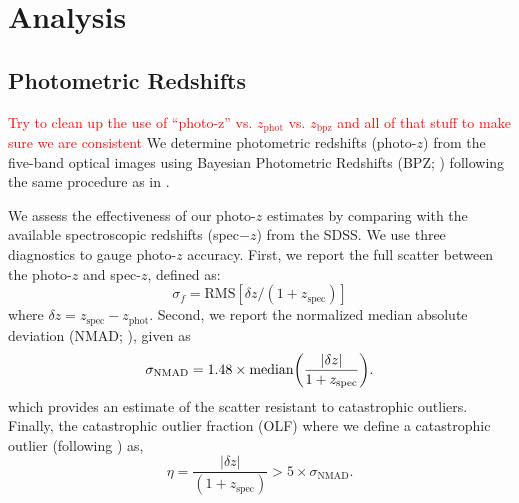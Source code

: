 \documentclass[apj, revtex4-1]{emulateapj}
\newcommand{\editorial}[1]{\textcolor{red}{#1}}
\begin{document}
\section{Analysis}\label{sec:analysis}
\subsection{Photometric Redshifts}
\editorial{Try to clean up the use of ``photo-z'' vs. $z_\mathrm{phot}$ vs. $z_\mathrm{bpz}$ and all of that stuff to make sure we are consistent}
We determine photometric redshifts (photo-$z$) from the five-band optical images using Bayesian Photometric Redshifts (BPZ; \citealt{Benitez2000, Coe2006}) following the same procedure as in \cite{Menanteau2009a}.

We assess the effectiveness of our photo-$z$ estimates by comparing with the available spectroscopic redshifts (spec$-z$) from the SDSS. We use three diagnostics to gauge photo-$z$ accuracy. First, we report the full scatter between the photo-$z$ and spec-$z$, defined as:
\begin{equation}\label{eqn:scatter}
	\sigma_f = \mathrm{RMS}[\delta z/(1+z_\mathrm{spec})]
\end{equation}
where $\delta z = z_\mathrm{spec} - z_\mathrm{phot}$. Second, we report the normalized median absolute deviation (NMAD; \citealt{Ilbert2009, Dahlen2013, Molino2017}), given as
\begin{equation}\label{eqn:nmad}
	\sigma_\mathrm{NMAD} = 1.48 \times \mathrm{median} \bigg{(} \frac{|\delta z|}{1+z_\mathrm{spec}} \bigg{)}.
\end{equation}
which provides an estimate of the scatter resistant to catastrophic outliers. Finally, the catastrophic outlier fraction (OLF) where we define a catastrophic outlier (following \citealt{Molino2017}) as,
\begin{equation}\label{eqn:OLF}
	\eta = \frac{|\delta z|}{(1+z_\mathrm{spec})} > 5 \times \sigma_\mathrm{NMAD}.
\end{equation}
\end{document}
